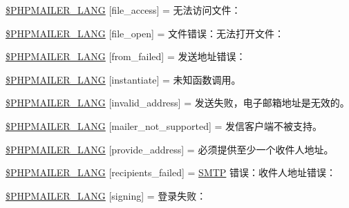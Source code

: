 \begin{DoxyCompactItemize}
\item 
\hyperlink{phpmailer_8lang-zh__cn_8php_a7e83349023b856ef9e5c46e30ae6d51e}{\$\+P\+H\+P\+M\+A\+I\+L\+E\+R\+\_\+\+L\+A\+NG} \mbox{[}\textquotesingle{}file\+\_\+access\textquotesingle{}\mbox{]} = \textquotesingle{}无法访问文件：\textquotesingle{}
\item 
\hyperlink{phpmailer_8lang-zh__cn_8php_a28d1a6517bf4c942a0ddd506188ad2e0}{\$\+P\+H\+P\+M\+A\+I\+L\+E\+R\+\_\+\+L\+A\+NG} \mbox{[}\textquotesingle{}file\+\_\+open\textquotesingle{}\mbox{]} = \textquotesingle{}文件错误：无法打开文件：\textquotesingle{}
\item 
\hyperlink{phpmailer_8lang-zh__cn_8php_adf832ae12155a09be077c6d5e4fd7e22}{\$\+P\+H\+P\+M\+A\+I\+L\+E\+R\+\_\+\+L\+A\+NG} \mbox{[}\textquotesingle{}from\+\_\+failed\textquotesingle{}\mbox{]} = \textquotesingle{}发送地址错误：\textquotesingle{}
\item 
\hyperlink{phpmailer_8lang-zh__cn_8php_ad58dde16780f4770ccf4dd282ea1f5ad}{\$\+P\+H\+P\+M\+A\+I\+L\+E\+R\+\_\+\+L\+A\+NG} \mbox{[}\textquotesingle{}instantiate\textquotesingle{}\mbox{]} = \textquotesingle{}未知函数调用。\textquotesingle{}
\item 
\hyperlink{phpmailer_8lang-zh__cn_8php_a42d61bcea4c79599ecb44fd062f54d47}{\$\+P\+H\+P\+M\+A\+I\+L\+E\+R\+\_\+\+L\+A\+NG} \mbox{[}\textquotesingle{}invalid\+\_\+address\textquotesingle{}\mbox{]} = \textquotesingle{}发送失败，电子邮箱地址是无效的。\textquotesingle{}
\item 
\hyperlink{phpmailer_8lang-zh__cn_8php_aa2ebcb8833ee83a7ad67401c4bb3a6ad}{\$\+P\+H\+P\+M\+A\+I\+L\+E\+R\+\_\+\+L\+A\+NG} \mbox{[}\textquotesingle{}mailer\+\_\+not\+\_\+supported\textquotesingle{}\mbox{]} = \textquotesingle{}发信客户端不被支持。\textquotesingle{}
\item 
\hyperlink{phpmailer_8lang-zh__cn_8php_a8b97897c2406b7392b056f375feeefbb}{\$\+P\+H\+P\+M\+A\+I\+L\+E\+R\+\_\+\+L\+A\+NG} \mbox{[}\textquotesingle{}provide\+\_\+address\textquotesingle{}\mbox{]} = \textquotesingle{}必须提供至少一个收件人地址。\textquotesingle{}
\item 
\hyperlink{phpmailer_8lang-zh__cn_8php_a7589d30bb9b368327c2df015f3e6bcba}{\$\+P\+H\+P\+M\+A\+I\+L\+E\+R\+\_\+\+L\+A\+NG} \mbox{[}\textquotesingle{}recipients\+\_\+failed\textquotesingle{}\mbox{]} = \textquotesingle{}\hyperlink{class_s_m_t_p}{S\+M\+TP} 错误：收件人地址错误：\textquotesingle{}
\item 
\hyperlink{phpmailer_8lang-zh__cn_8php_a68e437bdb9b968a5a67320f03d231565}{\$\+P\+H\+P\+M\+A\+I\+L\+E\+R\+\_\+\+L\+A\+NG} \mbox{[}\textquotesingle{}signing\textquotesingle{}\mbox{]} = \textquotesingle{}登录失败：\textquotesingle{}

\end{DoxyCompactItemize}
